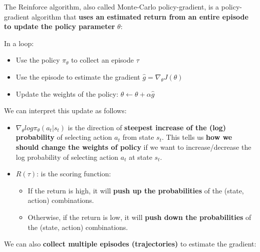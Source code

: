 \documentclass[11pt,a4paper]{article}
\begin{document}
The Reinforce algorithm, also called Monte-Carlo policy-gradient, is a policy-gradient algorithm that \textbf{uses an estimated return from an entire episode to update the policy parameter} \(\theta\):

In a loop:

\begin{itemize}
\tightlist
\item
  Use the policy \(\pi_\theta\) to collect an episode \(\tau\)
\item
  Use the episode to estimate the gradient \(\hat{g} = \nabla_\theta J(\theta)\)
\end{itemize}


\begin{itemize}
\tightlist
\item
  Update the weights of the policy: \(\theta \leftarrow \theta + \alpha \hat{g}\)
\end{itemize}

We can interpret this update as follows:

\begin{itemize}
\item
  \(\nabla_\theta log \pi_\theta(a_t|s_t)\) is the direction of \textbf{steepest increase of the (log) probability} of selecting action \(a_t\) from state \(s_t\). This tells us \textbf{how we should change the weights of policy} if we want to increase/decrease the log probability of selecting action \(a_t\) at state \(s_t\).
\item
  \(R(\tau)\): is the scoring function:

  \begin{itemize}
  \tightlist
  \item
    If the return is high, it will \textbf{push up the probabilities} of the (state, action) combinations.
  \item
    Otherwise, if the return is low, it will \textbf{push down the probabilities} of the (state, action) combinations.
  \end{itemize}
\end{itemize}

We can also \textbf{collect multiple episodes (trajectories)} to estimate the gradient:

\end{document}
